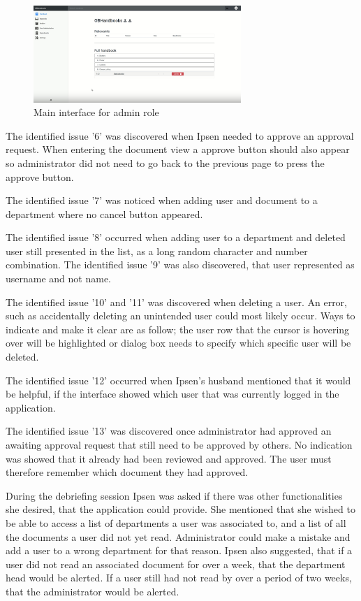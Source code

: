\documentclass[../../master.tex]{subfiles}
\begin{document}
\begin{figure}[H]
	\centering
		\includegraphics[width=0.7\textwidth]{billeder/MainInterfaceAdmin.png}
	\caption{Main interface for admin role}\label{fig:MainInterfaceAdmin}
\end{figure}

The identified issue '6' was discovered when Ipsen needed to approve an approval request.
When entering the document view a approve button should also appear so administrator did not need to go back to the previous page to press the approve button.

The identified issue '7' was noticed when adding user and document to a department where no cancel button appeared.

The identified issue '8' occurred when adding user to a department and deleted user still presented in the list, as a long random character and number combination.
The identified issue '9' was also discovered, that user represented as username and not name.

The identified issue '10'  and '11' was discovered when deleting a user.
An error, such as accidentally deleting an unintended user could most likely occur.
Ways to indicate and make it clear are as follow; the user row that the cursor is hovering over will be highlighted or dialog box needs to specify which specific user will be deleted.

The identified issue '12' occurred when Ipsen's husband mentioned that it would be helpful, if the interface showed which user that was currently logged in the application.

The identified issue '13' was discovered once administrator had approved an awaiting approval request that still need to be approved by others.
No indication was showed that it already had been reviewed and approved.
The user must therefore remember which document they had approved.


During the debriefing session Ipsen was asked if there was other functionalities she desired, that the application could provide.
She mentioned that she wished to be able to access a list of departments a user was associated to, and a list of all the documents a user did not yet read.
Administrator could make a mistake and add a user to a wrong department for that reason.
Ipsen also suggested, that if a user did not read an associated document for over a week, that the department head would be alerted.
If a user still had not read by over a period of two weeks, that the administrator would be alerted.
\end{document}
